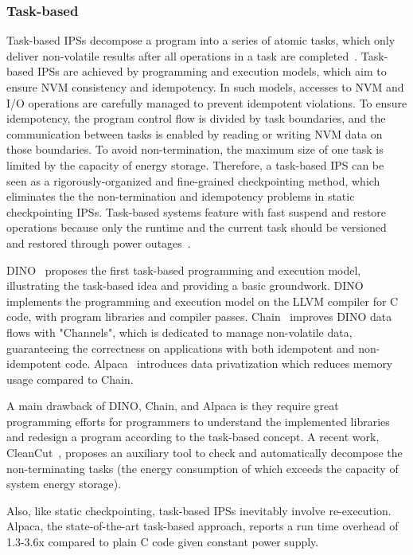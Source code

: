 \subsubsection{Task-based}

Task-based IPSs decompose a program into a series of atomic tasks, which only deliver non-volatile results after all operations in a task are completed~\cite{lucia2015simpler}. 
Task-based IPSs are achieved by programming and execution models, which aim to ensure NVM consistency and idempotency. 
In such models, accesses to NVM and I/O operations are carefully managed to prevent idempotent violations. 
To ensure idempotency, the program control flow is divided by task boundaries, and the communication between tasks is enabled by reading or writing NVM data on those boundaries. 
To avoid non-termination, the maximum size of one task is limited by the capacity of energy storage. 
Therefore, a task-based IPS can be seen as a rigorously-organized and fine-grained checkpointing method, which eliminates the the non-termination and idempotency problems in static checkpointing IPSs. 
Task-based systems feature with fast suspend and restore operations because only the runtime and the current task should be versioned and restored through power outages~\cite{sliper2018enabling}. 

DINO~\cite{lucia2015simpler} proposes the first task-based programming and execution model, illustrating the task-based idea and providing a basic groundwork. 
DINO implements the programming and execution model on the LLVM compiler for C code, with program libraries and compiler passes. 
Chain~\cite{colin2016chain} improves DINO data flows with "Channels", which is dedicated to manage non-volatile data, guaranteeing the correctness on applications with both idempotent and non-idempotent code. 
Alpaca~\cite{maeng2017alpaca} introduces data privatization which reduces memory usage compared to Chain.

A main drawback of DINO, Chain, and Alpaca is they require great programming efforts for programmers to understand the implemented libraries and redesign a program according to the task-based concept. 
A recent work, CleanCut~\cite{colin2018termination}, proposes an auxiliary tool to check and automatically decompose the non-terminating tasks (the energy consumption of which exceeds the capacity of system energy storage). 

Also, like static checkpointing, task-based IPSs inevitably involve re-execution. 
Alpaca, the state-of-the-art task-based approach, reports a run time overhead of 1.3-3.6x compared to plain C code given constant power supply. 

